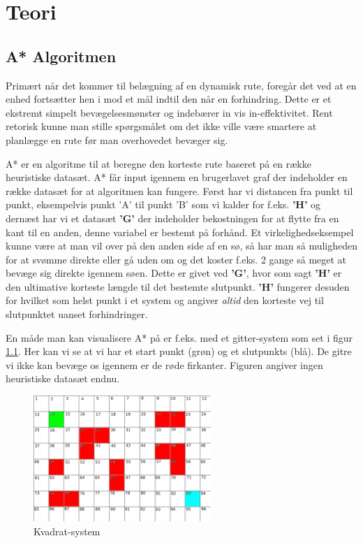 \chapter{Teori}

\section{A* Algoritmen}
Primært når det kommer til belægning af en dynamisk rute, foregår det ved at en enhed fortsætter hen i mod et mål indtil den når en forhindring. Dette er et ekstremt simpelt bevægelsesmønster og indebærer in vis in-effektivitet. Rent retorisk kunne man stille spørgsmålet om det ikke ville være smartere at planlægge en rute før man overhovedet bevæger sig.

A* er en algoritme til at beregne den korteste rute baseret på en række heuristiske datasæt. A* får input igennem en brugerlavet graf der indeholder en række datasæt for at algoritmen kan fungere.  Først har vi distancen fra punkt til punkt, eksempelvis punkt 'A' til punkt 'B' som vi kalder for f.eks. \textbf{'H'} og dernæst har vi et datasæt \textbf{'G'} der indeholder bekostningen for at flytte fra en kant til en anden, denne variabel er bestemt på forhånd. Et virkelighedseksempel kunne være at man vil over på den anden side af en sø, så har man så muligheden for at svømme direkte eller gå uden om og det koster f.eks. 2 gange så meget at bevæge sig direkte igennem søen. Dette er givet ved \textbf{'G'}, hvor som sagt \textbf{'H'} er den ultimative korteste længde til det bestemte slutpunkt. \textbf{'H'} fungerer desuden for hvilket som helst punkt i et system og angiver \textit{altid} den korteste vej til slutpunktet uanset forhindringer.

En måde man kan visualisere A* på er f.eks. med et gitter-system som set i figur \ref{A*Kvadrat-1}. Her kan vi se at vi har et start punkt (grøn) og et slutpunkts (blå). De gitre vi ikke kan bevæge os igennem er de røde firkanter. Figuren angiver ingen heuristiske datasæt endnu.

\begin{figure}
    \centering
    \includegraphics[width=0.60\textwidth]{Pictures/Teoriafsnit/Figurfiler/Grid2.png}
    \caption{Kvadrat-system}
    \label{A*Kvadrat-1}
\end{figure}

